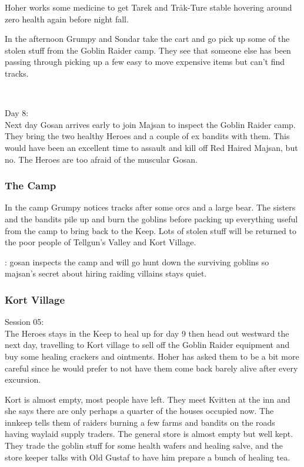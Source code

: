 Hoher works some medicine to get Tarek and Tråk-Ture stable hovering around zero health again before night fall.

In the afternoon Grumpy and Sondar take the cart and go pick up some of the stolen stuff from the Goblin Raider camp. They see that someone else has been passing through picking up a few easy to move expensive items but can't find tracks.

\

Day 8:\\
Next day Gosan arrives early to join Majsan to inspect the Goblin Raider camp. They bring the two healthy Heroes and a couple of ex bandits with them. This would have been an excellent time to assault and kill off Red Haired Majsan, but no. The Heroes are too afraid of the muscular Gosan.


\subsubsection*{The Camp}
In the camp Grumpy notices tracks after some orcs and a large bear. The sisters and the bandits pile up and burn the goblins before packing up everything useful from the camp to bring back to the Keep. Lots of stolen stuff will be returned to the poor people of Tellgun's Valley and Kort Village.

\begin{readoutloud}
\todo: gosan inspects the camp and will go hunt down the surviving goblins so majsan's secret about hiring raiding villains stays quiet.
\end{readoutloud}


\subsubsection*{Kort Village}
\forceindent Session 05:\\                                              %
The Heroes stays in the Keep to heal up for day 9 then head out westward the next day, travelling to Kort village to sell off the Goblin Raider equipment and buy some healing crackers and ointments. Hoher has asked them to be a bit more careful since he would prefer to not have them come back barely alive after every excursion.

Kort is almost empty, most people have left. They meet Kvitten at the inn and she says there are only perhaps a quarter of the houses occupied now. The innkeep tells them of raiders burning a few farms and bandits on the roads having waylaid supply traders. The general store is almost empty but well kept. They trade the goblin stuff for some health wafers and healing salve, and the store keeper talks with Old Gustaf to have him prepare a bunch of healing tea.

